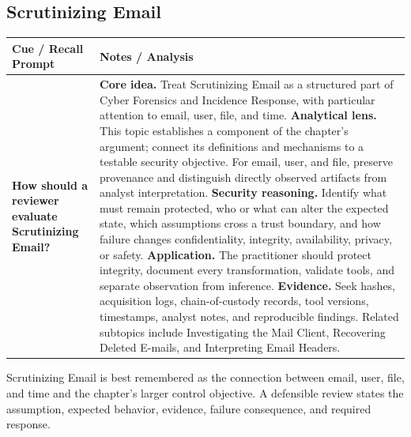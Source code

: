 \documentclass[11pt]{article}
\newcommand{\CornellHeader}{%
\rowcolor{Navy}\color{white}\bfseries Cue / Recall Prompt & \color{white}\bfseries Notes / Analysis\\\hline}
\newcommand{\CornellRow}[2]{%
\cellcolor{CueGray}\RaggedRight\textbf{#1} & \RaggedRight #2\\\hline}
\begin{document}
\subsection*{Scrutinizing Email}
\begin{longtable}{>{\RaggedRight\arraybackslash}p{}|>{\RaggedRight\arraybackslash}p{}}
\CornellHeader
\CornellRow{How should a reviewer evaluate Scrutinizing Email?}{\textbf{Core idea.} Treat Scrutinizing Email as a structured part of Cyber Forensics and Incidence Response, with particular attention to email, user, file, and time. \textbf{Analytical lens.} This topic establishes a component of the chapter's argument; connect its definitions and mechanisms to a testable security objective. For email, user, and file, preserve provenance and distinguish directly observed artifacts from analyst interpretation. \textbf{Security reasoning.} Identify what must remain protected, who or what can alter the expected state, which assumptions cross a trust boundary, and how failure changes confidentiality, integrity, availability, privacy, or safety. \textbf{Application.} The practitioner should protect integrity, document every transformation, validate tools, and separate observation from inference. \textbf{Evidence.} Seek hashes, acquisition logs, chain-of-custody records, tool versions, timestamps, analyst notes, and reproducible findings. Related subtopics include Investigating the Mail Client, Recovering Deleted E-mails, and Interpreting Email Headers.}
\end{longtable}
\begin{topicsummary}
Scrutinizing Email is best remembered as the connection between email, user, file, and time and the chapter's larger control objective. A defensible review states the assumption, expected behavior, evidence, failure consequence, and required response.
\end{topicsummary}
\end{document}
